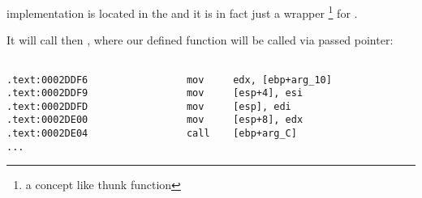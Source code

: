 {\qsort implementation is located in the  and it is in fact just a wrapper
\footnote{a concept like \gls{thunk function}} for .}

{It will call then , where our defined function will be called via passed pointer:}


\begin{lstlisting}[caption=
\IFRU{(файл libc.so.6, версия glibc ~--- 2.10.1)}{(File libc.so.6, glibc version~---2.10.1)}]

.text:0002DDF6                 mov     edx, [ebp+arg_10]
.text:0002DDF9                 mov     [esp+4], esi
.text:0002DDFD                 mov     [esp], edi
.text:0002DE00                 mov     [esp+8], edx
.text:0002DE04                 call    [ebp+arg_C]
...
\end{lstlisting}
